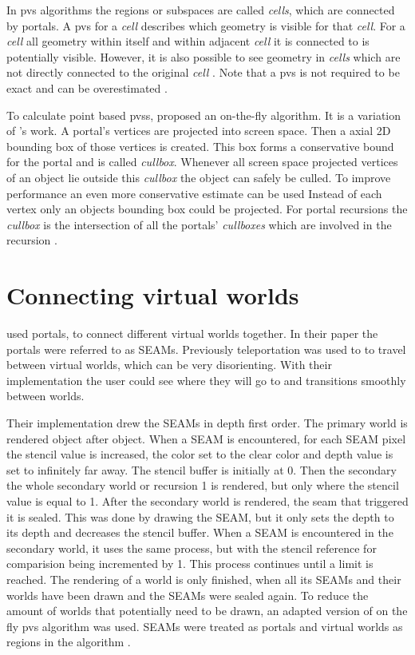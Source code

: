 In \gls{pvs} algorithms the regions or subspaces are called \textit{cells}, which are connected by portals. A \gls{pvs} for a \textit{cell} describes which geometry is visible for that \textit{cell}. For a \textit{cell} all geometry within itself and within adjacent \textit{cell} it is connected to is potentially visible. However, it is also possible to see geometry in \textit{cells} which are not directly connected to the original \textit{cell} . Note that a \gls{pvs} is not required to be exact and can be overestimated \cite{cohen:2003:survey}.

To calculate point based \glspl{pvs}, \textcite{luebke:1995:portals} proposed an on-the-fly algorithm. It is  a variation of \textcite{jones:1971:new}'s work. A portal's vertices are projected into screen space. Then a axial 2D bounding box of those vertices is created. This box forms a conservative bound for the portal and is called  \textit{cullbox}. Whenever all screen space projected vertices of an object lie outside this \textit{cullbox} the object can safely be culled.  To improve performance an even more conservative estimate can be used Instead of each vertex only an objects bounding box could be projected.  For portal recursions the \textit{cullbox} is the intersection of all the portals' \textit{cullboxes} which are involved in the recursion \cite{luebke:1995:portals}. 



\section{Connecting virtual worlds}

\textcite{schmalstieg:1999:sewing} used portals, to connect different virtual worlds together. In their paper the portals were referred to as SEAMs. Previously teleportation was used to to travel between virtual worlds, which can be very disorienting. With their implementation the user could see where they will go to and transitions smoothly between worlds.


Their implementation drew the SEAMs in depth first order. The primary world is rendered object after object. When a SEAM is encountered, for each SEAM pixel  the stencil value is increased, the color set to the clear color and  depth value is set to infinitely far away. The stencil buffer is initially at 0. Then the secondary the whole secondary world or recursion 1 is rendered, but only where the stencil value is equal to 1. After the secondary world is rendered, the seam that triggered it is sealed. This was done by drawing the SEAM, but it only sets the depth to its depth and decreases the stencil buffer. When a SEAM is encountered in the secondary world, it uses the same process, but with the stencil reference for comparision being incremented by 1. This process continues until a limit is reached. The rendering of a world is only finished, when all its SEAMs and their worlds have been drawn and the SEAMs were sealed again. To reduce the amount of worlds that potentially need to be drawn,  an adapted version of \textcite{luebke:1995:portals} on the fly \gls{pvs} algorithm was used. SEAMs were treated as portals and virtual worlds as regions in the algorithm \cite{schmalstieg:1999:sewing}.

